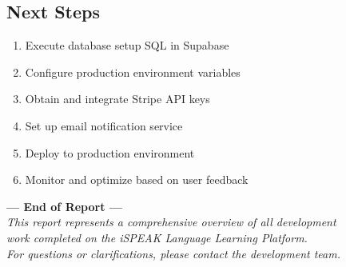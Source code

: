 \documentclass[11pt,a4paper]{article}
\begin{document}
\subsection{Next Steps}
\begin{enumerate}[leftmargin=*,itemsep=5pt]
    \item Execute database setup SQL in Supabase
    \item Configure production environment variables
    \item Obtain and integrate Stripe API keys
    \item Set up email notification service
    \item Deploy to production environment
    \item Monitor and optimize based on user feedback
\end{enumerate}

\vspace{2cm}
\begin{center}
\large\textbf{--- End of Report ---}\\
\vspace{1cm}
\normalsize\textit{This report represents a comprehensive overview of all development\\
work completed on the iSPEAK Language Learning Platform.\\
For questions or clarifications, please contact the development team.}
\end{center}
\end{document}
